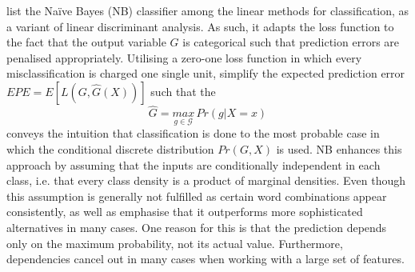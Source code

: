 \textcite[p.~211]{Friedman.2001} list the Na\"{i}ve Bayes (NB) classifier among the linear methods for classification, as a variant of linear discriminant analysis. As such, it adapts the loss function to the fact that the output variable $G$ is categorical such that prediction errors are penalised appropriately. Utilising a zero-one loss function in which every misclassification is charged one single unit, \textcite[pp.~20-21]{Friedman.2001} simplify the expected prediction error $EPE=E[L(G,\hat{G}(X))]$ such that the 
%
\begin{equation}
	\hat{G} = \underset{g\in \mathcal{G}}{max}\, Pr(g|X=x)
\end{equation}
%
conveys the intuition that classification is done to the most probable case in which the conditional discrete distribution $Pr(G,X)$ is used. NB enhances this approach by assuming that the inputs are conditionally independent in each class, i.e. that every class density is a product of marginal densities. Even though this assumption is generally not fulfilled as certain word combinations appear consistently, \textcite{Friedman.2001} as well as \textcite{Rish.2001} emphasise that it outperforms more sophisticated alternatives in many cases. One reason for this is that the prediction depends only on the maximum probability, not its actual value. Furthermore, dependencies cancel out in many cases when working with a large set of features. 

%
